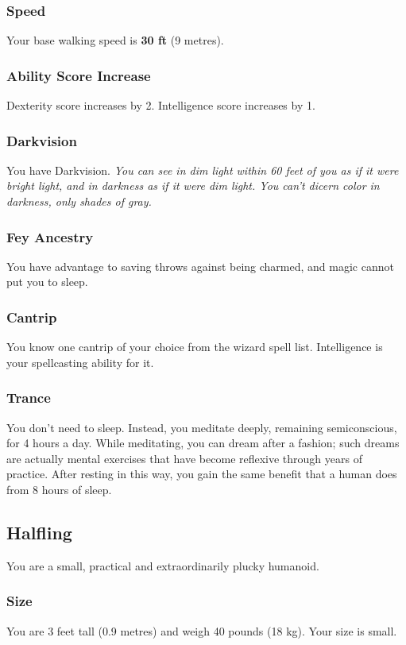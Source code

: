 \documentclass[10pt,twoside]{article}
\begin{document}
\begin{multicols}{2}
\subsubsection*{Speed}
Your base walking speed is \textbf{30 ft} (9 metres).

\subsubsection*{Ability Score Increase}
Dexterity score increases by 2.
Intelligence score increases by 1.

\subsubsection*{Darkvision}
You have Darkvision.
\textit{You can see in dim light within 60 feet of you as if it were bright light, and in darkness as if it were dim light. You can’t dicern color in darkness, only shades of gray.}

\subsubsection*{Fey Ancestry}
You have advantage to saving throws against being charmed, and magic cannot put you to sleep.

\subsubsection*{Cantrip}
You know one cantrip of your choice from the wizard spell list. Intelligence is your spellcasting ability for it.

\subsubsection*{Trance}
You don’t need to sleep. Instead, you meditate deeply, remaining semiconscious, for 4 hours a day. While meditating, you can dream after a fashion; such dreams are actually mental exercises that have become reflexive through years of practice. After resting in this way, you gain the same benefit that a human does from 8 hours of sleep.


\subsection{Halfling}

You are a small, practical and extraordinarily plucky humanoid.

\subsubsection*{Size}
You are 3 feet tall (0.9 metres) and weigh 40 pounds (18 kg). Your size is small.


\end{multicols}
\end{document}
